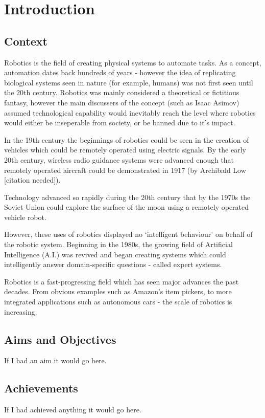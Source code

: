 \documentclass[../dissertation.tex]{subfiles}
\begin{document}
\chapter{Introduction}

\section{Context}

Robotics is the field of creating physical systems to automate tasks. As a concept, automation dates back hundreds of years - however the idea of replicating biological systems seen in nature (for example, humans) was not first seen until the 20th century. Robotics was mainly considered a theoretical or fictitious fantasy, however the main discussers of the concept (such as Isaac Asimov) assumed technological capability would inevitably reach the level where robotics would either be inseperable from society, or be banned due to it's impact.

In the 19th century the beginnings of robotics could be seen in the creation of vehicles which could be remotely operated using electric signals. By the early 20th century, wireless radio guidance systems were advanced enough that remotely operated aircraft could be demonstrated in 1917 (by Archibald Low [citation needed]).

Technology advanced so rapidly during the 20th century that by the 1970s the Soviet Union could explore the surface of the moon using a remotely operated vehicle robot.

However, these uses of robotics displayed no `intelligent behaviour' on behalf of the robotic system. Beginning in the 1980s, the growing field of Artificial Intelligence (A.I.) was revived and began creating systems which could intelligently answer domain-specific questions - called expert systems.

Robotics is a fast-progressing field which has seen major advances the past decades. From obvious examples such as Amazon's item pickers, to more integrated applications such as autonomous cars - the scale of robotics is increasing.

\section{Aims and Objectives}

If I had an aim it would go here.

\section{Achievements}

If I had achieved anything it would go here.
\end{document}

